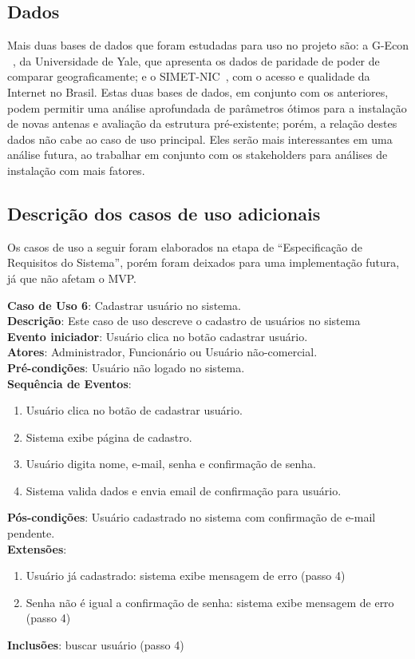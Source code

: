 \documentclass[]{politex}
\begin{document}
\subsection{Dados}

Mais duas bases de dados que foram estudadas para uso no projeto são: a G-Econ
~\cite{gecon}, da Universidade de Yale, que apresenta os dados de paridade de
poder de comparar geograficamente; e o SIMET-NIC~\cite{simet}, com o acesso e
qualidade da Internet no Brasil. Estas duas bases de dados, em conjunto com os
anteriores, podem permitir uma análise aprofundada de parâmetros ótimos para a
instalação de novas antenas e avaliação da estrutura pré-existente; porém,
a relação destes dados não cabe ao caso de uso principal. Eles serão mais
interessantes em uma análise futura, ao trabalhar em conjunto com os
stakeholders para análises de instalação com mais fatores.

\subsection{Descrição dos casos de uso adicionais}

Os casos de uso a seguir foram elaborados na etapa de ``Especificação de
Requisitos do Sistema'', porém foram deixados para uma implementação futura, já
que não afetam o MVP.

\noindent \textbf{Caso de Uso 6}: Cadastrar usuário no sistema.  \\
\textbf{Descrição}: Este caso de uso descreve o cadastro de usuários no sistema \\
\textbf{Evento iniciador}: Usuário clica no botão cadastrar usuário. \\
\textbf{Atores}: Administrador, Funcionário ou Usuário não-comercial. \\
\textbf{Pré-condições}: Usuário não logado no sistema. \\
\textbf{Sequência de Eventos}:
\begin{enumerate}
\item Usuário clica no botão de cadastrar usuário.
\item Sistema exibe página de cadastro.
\item Usuário digita nome, e-mail, senha e confirmação de senha.
\item Sistema valida dados e envia email de confirmação para usuário.
\end{enumerate}
\textbf{Pós-condições}: Usuário cadastrado no sistema com confirmação de e-mail pendente. \\
\textbf{Extensões}:
\begin{enumerate}
\item Usuário já cadastrado: sistema exibe mensagem de erro (passo 4)
\item Senha não é igual a confirmação de senha: sistema exibe mensagem de erro (passo 4)
\end{enumerate}
\textbf{Inclusões}: buscar usuário (passo 4) \\
\end{document}
